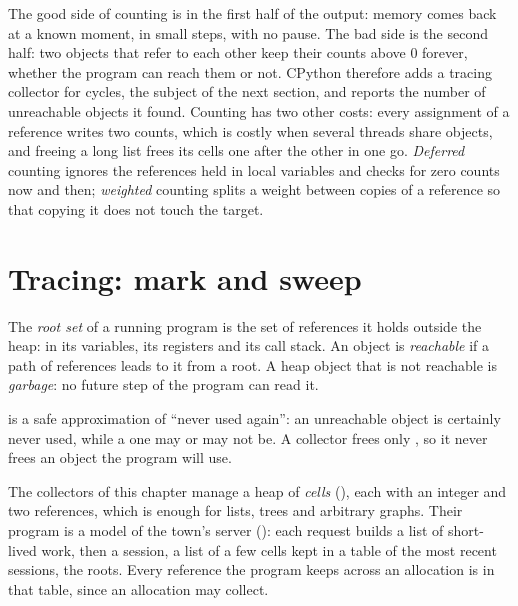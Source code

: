 The good side of counting is in the first half of the output: memory comes back at a known moment, in small steps, with no pause. The bad side is the second half: two objects that refer to each other keep their counts above 0 forever, whether the program can reach them or not. CPython therefore adds a tracing collector for cycles, the subject of the next section, and  reports the number of unreachable objects it found. %
Counting has two other costs: every assignment of a reference writes two counts, which is costly when several threads share objects, and freeing a long list frees its cells one after the other in one go. \emph{Deferred} counting ignores the references held in local variables and checks for zero counts now and then; \emph{weighted} counting splits a weight between copies of a reference so that copying it does not touch the target.

\section{Tracing: mark and sweep}\label{sec:b3:garbage-collection:tracing}

\begin{definition}\label{def:b3:garbage-collection:reachability}
The \emph{root set} of a running program is the set of references it holds outside the heap: in its variables, its registers and its call stack. An object is \emph{reachable} if a path of references leads to it from a root. A heap object that is not reachable is \emph{garbage}: no future step of the program can read it.
\end{definition}

 is a safe approximation of ``never used again'': an unreachable object is certainly never used, while a  one may or may not be. A collector frees only , so it never frees an object the program will use.

The collectors of this chapter manage a heap of \emph{cells} (), each with an integer and two references, which is enough for lists, trees and arbitrary graphs. Their program is a model of the town's server (): each request builds a list of short-lived work, then a session, a list of a few cells kept in a table of the most recent sessions, the roots. Every reference the program keeps across an allocation is in that table, since an allocation may collect.

